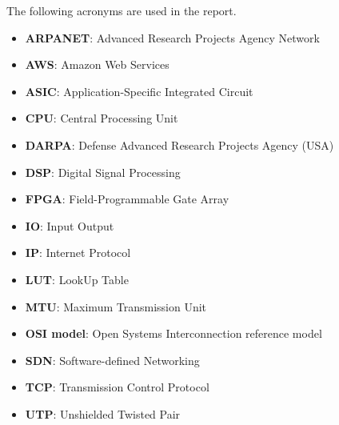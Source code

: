 The following acronyms are used in the report.
\begin{itemize}
  \item \textbf{ARPANET}: Advanced Research Projects Agency Network
  \item \textbf{AWS}: Amazon Web Services
  \item \textbf{ASIC}: Application-Specific Integrated Circuit
  \item \textbf{CPU}: Central Processing Unit
  \item \textbf{DARPA}: Defense Advanced Research Projects Agency (USA)
  \item \textbf{DSP}: Digital Signal Processing
  \item \textbf{FPGA}: Field-Programmable Gate Array
  \item \textbf{IO}: Input Output
  \item \textbf{IP}: Internet Protocol
  \item \textbf{LUT}: LookUp Table
  \item \textbf{MTU}: Maximum Transmission Unit
  \item \textbf{OSI model}: Open Systems Interconnection reference model
  \item \textbf{SDN}: Software-defined Networking
  \item \textbf{TCP}: Transmission Control Protocol
  \item \textbf{UTP}: Unshielded Twisted Pair
\end{itemize}
